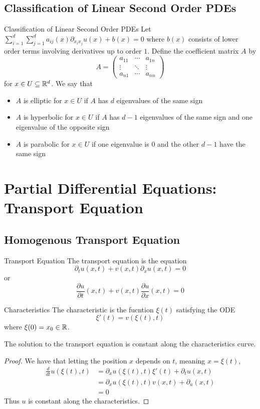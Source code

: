 \documentclass[a4paper]{article}
\begin{document}
\subsection{Classification of Linear Second Order PDEs}
\begin{defn}{Classification of Linear Second Order PDEs}{} Let $\sum_{i=1}^d\sum_{j=1}^da_{ij}(x)\partial_{x_ix_j}u(x)+b(x)=0$ where $b(x)$ consists of lower order terms involving derivatives up to order $1$. Define the coefficient matrix $A$ by $$A=\begin{pmatrix}
a_{11} & \cdots & a_{1n}\\
\vdots & \ddots & \vdots\\
a_{n1} & \cdots & a_{nn}
\end{pmatrix}$$ for $x\in U\subseteq\mathbb{R}^d$. We say that 
\begin{itemize}
\item $A$ is elliptic for $x\in U$ if $A$ has $d$ eigenvalues of the same sign
\item $A$ is hyperbolic for $x\in U$ if $A$ has $d-1$ eigenvalues of the same sign and one eigenvalue of the opposite sign
\item $A$ is parabolic for $x\in U$ if one eigenvalue is $0$ and the other $d-1$ have the same sign
\end{itemize}
\end{defn}

\pagebreak
\section{Partial Differential Equations: Transport Equation}
\subsection{Homogenous Transport Equation}
\begin{defn}{Transport Equation}{} The transport equation is the equation $$\partial_tu(x,t)+v(x,t)\partial_xu(x,t)=0$$ or $$\frac{\partial u}{\partial t}(x,t)+v(x,t)\frac{\partial u}{\partial x}(x,t)=0$$
\end{defn}

\begin{defn}{Characteristics}{} The characteristic is the fucntion $\xi(t)$ satisfying the ODE $$\xi'(t)=v(\xi(t),t)$$ where $\xi(0)=x_0\in\mathbb{R}$. 
\end{defn}

\begin{prp}{}{} The solution to the transport equation is constant along the characteristics curve. \tcbline\begin{proof} We have that letting the position $x$ depends on $t$, meaning $x=\xi(t)$,
\begin{align*}
\frac{d}{dt}u(\xi(t),t)&=\partial_xu(\xi(t),t)\xi'(t)+\partial_tu(x,t)\\
&=\partial_xu(\xi(t),t)v(x,t)+\partial_u(x,t)\\
&=0
\end{align*}
Thus $u$ is constant along the characteristics. 
\end{proof}
\end{prp}
\end{document}
